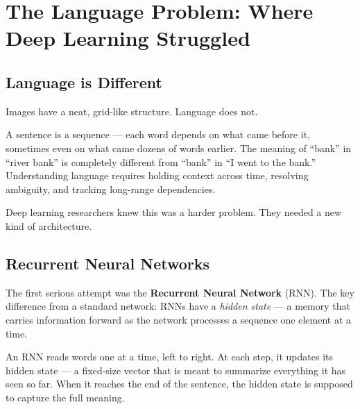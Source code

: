 \section{The Language Problem: Where Deep Learning Struggled}

\subsection{Language is Different}

Images have a neat, grid-like structure.
Language does not.

A sentence is a sequence --- each word depends on what came before it, sometimes even on what came dozens of words earlier.
The meaning of ``bank'' in ``river bank'' is completely different from ``bank'' in ``I went to the bank.''
Understanding language requires holding context across time, resolving ambiguity, and tracking long-range dependencies.

Deep learning researchers knew this was a harder problem.
They needed a new kind of architecture.

\subsection{Recurrent Neural Networks}

The first serious attempt was the \textbf{Recurrent Neural Network} (RNN).
The key difference from a standard network: RNNs have a \emph{hidden state} --- a memory that carries information forward as the network processes a sequence one element at a time.

\begin{tcolorbox}[colback=green!5!white, colframe=green!40!black, title=How an RNN Reads a Sentence]
An RNN reads words one at a time, left to right.
At each step, it updates its hidden state --- a fixed-size vector that is meant to summarize everything it has seen so far.
When it reaches the end of the sentence, the hidden state is supposed to capture the full meaning.
\end{tcolorbox}

